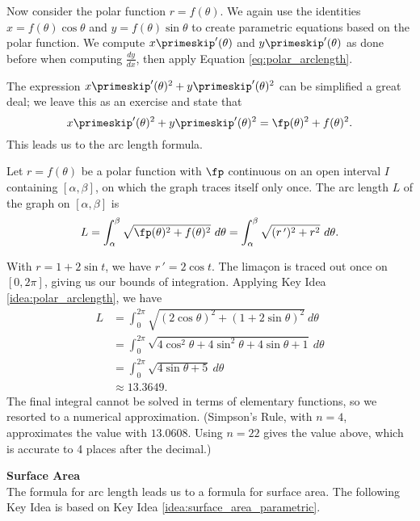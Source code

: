 Now consider the polar function $r=f(\theta)$. We again use the identities $x=f(\theta)\cos\theta$ and $y=f(\theta)\sin\theta$ to create parametric equations based on the polar function. We compute $x\primeskip'(\theta)$ and $y\primeskip'(\theta)$ as done before when computing $\frac{dy}{dx}$, then apply Equation \eqref{eq:polar_arclength}.

The expression $x\primeskip'(\theta)^2+y\primeskip'(\theta)^2$ can be simplified a great deal; we leave this as an exercise and state that $$x\primeskip'(\theta)^2+y\primeskip'(\theta)^2 = \fp(\theta)^2+f(\theta)^2.$$ This leads us to the  arc length formula.

{Let  $r=f(\theta)$ be a polar function with $\fp$ continuous on an open interval $I$ containing $[\alpha,\beta]$, on which the graph traces itself only once. The arc length $L$ of the graph on $[\alpha,\beta]$ is
$$L = \int_\alpha^\beta \sqrt{\fp(\theta)^2+f(\theta)^2}\ d\theta = \int_\alpha^\beta\sqrt{(r\,')^2+ r^2}\ d\theta.$$
}

{With $r=1+2\sin t$, we have $r\,' = 2\cos t$. The lima\c con is traced out once on $[0,2\pi]$, giving us our bounds of integration. Applying Key Idea \ref{idea:polar_arclength}, we have
\begin{align*}
L 	&= \int_0^{2\pi} \sqrt{(2\cos\theta)^2+(1+2\sin\theta)^2}\ d\theta \\
		&=	\int_0^{2\pi} \sqrt{4\cos^2\theta+4\sin^2\theta +4\sin\theta+1}\ d\theta\\
		&=	\int_0^{2\pi} \sqrt{4\sin\theta+5}\ d\theta\\
		&\approx 13.3649.
\end{align*}
The final integral cannot be solved in terms of elementary functions, so we resorted to a numerical approximation. (Simpson's Rule, with $n=4$, approximates the value with $13.0608$. Using $n=22$ gives the value above, which is accurate to 4 places after the decimal.) 
}\\
\pagebreak

\noindent\textbf{\large Surface Area}\\

The formula for arc length leads us to a formula for surface area. The following Key Idea is based on Key Idea \ref{idea:surface_area_parametric}.

